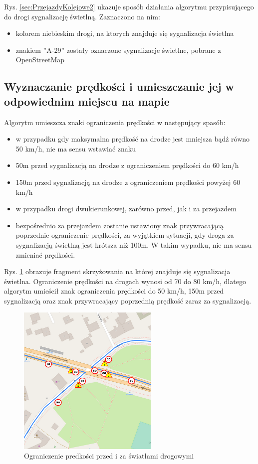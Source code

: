 Rys. \ref{sec:PrzejazdyKolejowe2} ukazuje sposób działania algorytmu przypisującego do drogi sygnalizację świetlną. Zaznaczono na nim:
\begin{itemize}
\item kolorem niebieskim drogi, na ktorych znajduje się sygnalizacja świetlna
\item znakiem ''A-29'' zostały oznaczone sygnalizacje świetlne, pobrane z OpenStreetMap
\end{itemize}

\newpage
\subsection{Wyznaczanie prędkości i umieszczanie jej w odpowiednim miejscu na mapie}

Algorytm umieszcza znaki ograniczenia prędkości w następujący spasób:
\begin{itemize}
\item w przypadku gdy maksymalna prędkość na drodze jest mniejsza bądź równo 50 km/h, nie ma sensu wstawiać znaku
\item 50m przed sygnalizacją na drodze z ograniczeniem prędkości do 60 km/h
\item 150m przed sygnalizacją na drodze z ograniczeniem prędkości powyżej 60 km/h
\item w przypadku drogi dwukierunkowej, zarówno przed, jak i za przejazdem
\item bezpośrednio za przejazdem zostanie ustawiony znak przywracającą poprzednie ograniczenie prędkości, za wyjątkiem sytuacji, gdy droga za sygnalizacją świetlną jest krótsza niż 100m. W takim wypadku, nie ma sensu zmieniać prędkości.
\end{itemize}


Rys. \ref{sec:znakiSwiatla} obrazuje fragment skrzyżowania na której znajduje się sygnalizacja świetlna. Ograniczenie prędkości na drogach wynosi od 70 do 80 km/h, dlatego algorytm umieścił znak ograniczenia prędkości do 50 km/h, 150m przed sygnalizacją oraz znak przywracający poprzednią prędkość zaraz za sygnalizacją.

\begin{figure}[h]
\caption{Ograniczenie predkości przed i za światłami drogowymi}
\label{sec:znakiSwiatla}
\centering
\includegraphics[width=0.6\textwidth]{speedBeforeSignals}
\end{figure}


